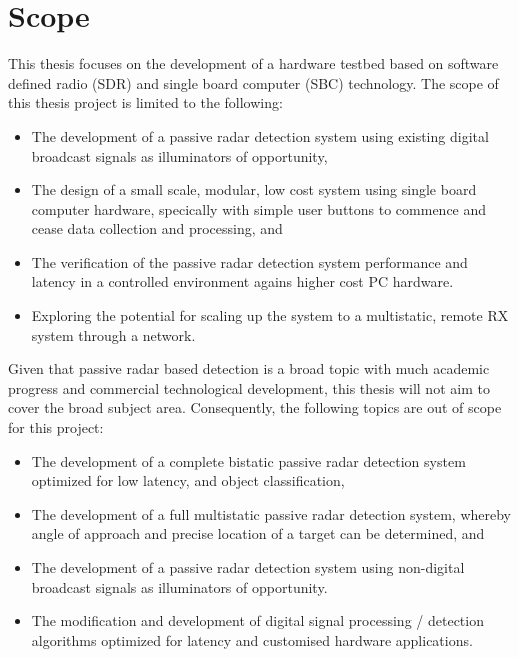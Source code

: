 \section{Scope}
This thesis focuses on the development of a hardware testbed based on software defined radio (SDR) and single board computer (SBC) technology. The scope of this thesis project is limited to the following:

\begin{itemize}
    \item The development of a passive radar detection system using existing digital broadcast signals as illuminators of opportunity,
    \item The design of a small scale, modular, low cost system using single board computer hardware, specically with simple user buttons to commence and cease data collection and processing, and 
    \item The verification of the passive radar detection system performance and latency in a controlled environment agains higher cost PC hardware.
    \item Exploring the potential for scaling up the system to a multistatic, remote RX system through a network.
\end{itemize}

\noindent
Given that passive radar based detection is a broad topic with much academic progress and commercial technological development, this thesis will not aim to cover the broad subject area. Consequently, the following topics are out of scope for this project:

\begin{itemize}
    \item The development of a complete bistatic passive radar detection system optimized for low latency, and object classification,
    \item The development of a full multistatic passive radar detection system, whereby angle of approach and precise location of a target can be determined, and
    \item The development of a passive radar detection system using non-digital broadcast signals as illuminators of opportunity.
    \item The modification and development of digital signal processing / detection algorithms optimized for latency and customised hardware applications.
\end{itemize}
